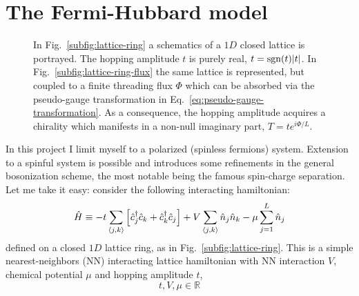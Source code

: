 \clearpage
\section{The Fermi-Hubbard model}

\begin{figure}
	\centering
	\hfil
	\caption{In Fig.~\ref{subfig:lattice-ring} a schematics of a $1D$ closed lattice is portrayed. The hopping amplitude $t$ is purely real, $t = \mathrm{sgn}(t) \abs{t}$. In Fig.~\ref{subfig:lattice-ring-flux} the same lattice is represented, but coupled to a finite threading flux $\Phi$ which can be absorbed via the pseudo-gauge transformation in Eq.~\eqref{eq:pseudo-gauge-transformation}. As a consequence, the hopping amplitude acquires a chirality which manifests in a non-null imaginary part, $T = t e^{i\Phi/L}$.}
	\label{fig:lattice-rings}
\end{figure}

In this project I limit myself to a polarized (spinless fermions) system. Extension to a spinful system is possible and introduces some refinements in the general bosonization scheme, the most notable being the famous spin-charge separation. Let me take it easy: consider the following interacting hamiltonian:
\begin{equation}\label{eq:spinless-hamiltonian-pbc}
	\hat H \equiv -t \sum_{\ev{j,k}} \left[
		\hat c_j^\dagger \hat c_k + \hat c_k^\dagger \hat c_j 
	\right] + V \sum_{\ev{j,k}} \hat n_j \hat n_k - \mu \sum_{j=1}^L \hat n_j
\end{equation}
defined on a closed $1D$ lattice ring, as in Fig.~\ref{subfig:lattice-ring}.
This is a simple nearest-neighbors (NN) interacting lattice hamiltonian with NN interaction $V$, chemical potential $\mu$ and hopping amplitude $t$,
\[
	t, V, \mu \in \mathbb{R}
\]

